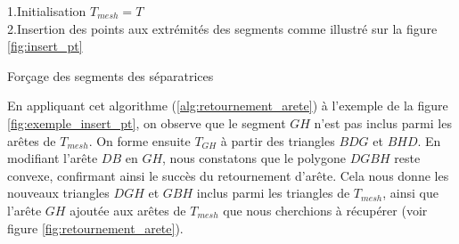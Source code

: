 \vspace{0.5cm}
\begin{algorithm}[H]
\label{alg:retournement_arete}
\renewcommand{\algorithmcfname}{Algorithme}%
\SetAlgoLined
{}
\vspace{0.2cm}
1.\quad Initialisation $T_{mesh}=T$\\[0.2cm]
2.\quad Insertion des points aux extrémités des segments comme illustré sur la figure \ref{fig:insert_pt}\\[0.2cm]
\caption{Forçage des segments des séparatrices}
\end{algorithm}
\vspace{0.5cm}

En appliquant cet algorithme (\ref{alg:retournement_arete}) à l'exemple de la figure \ref{fig:exemple_insert_pt}, on observe que le segment $GH$ n'est pas inclus parmi les arêtes de $T_{mesh}$. On forme ensuite $T_{GH}$ à partir des triangles $BDG$ et $BHD$. En modifiant l'arête $DB$ en $GH$, nous constatons que le polygone $DGBH$ reste convexe, confirmant ainsi le succès du retournement d'arête. Cela nous donne les nouveaux triangles $DGH$ et $GBH$ inclus parmi les triangles de $T_{mesh}$, ainsi que l'arête $GH$ ajoutée aux arêtes de $T_{mesh}$ que nous cherchions à récupérer (voir figure \ref{fig:retournement_arete}).

